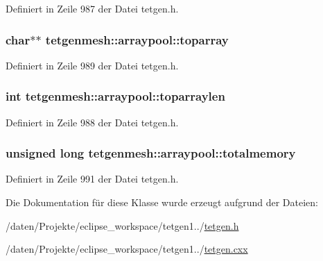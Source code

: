 Definiert in Zeile 987 der Datei tetgen.\-h.

\hypertarget{classtetgenmesh_1_1arraypool_a3a4e28a88226f1dd777773fe45094650}{
\subsubsection[{toparray}]{\setlength{\rightskip}{0pt plus 5cm}char$\ast$$\ast$ tetgenmesh\-::arraypool\-::toparray}}\label{classtetgenmesh_1_1arraypool_a3a4e28a88226f1dd777773fe45094650}


Definiert in Zeile 989 der Datei tetgen.\-h.

\hypertarget{classtetgenmesh_1_1arraypool_aa9ced327d45678f31b4e7f8e75aff861}{
\subsubsection[{toparraylen}]{\setlength{\rightskip}{0pt plus 5cm}int tetgenmesh\-::arraypool\-::toparraylen}}\label{classtetgenmesh_1_1arraypool_aa9ced327d45678f31b4e7f8e75aff861}


Definiert in Zeile 988 der Datei tetgen.\-h.

\hypertarget{classtetgenmesh_1_1arraypool_af264f265d5752e75f50adea472ecd59f}{
\subsubsection[{totalmemory}]{\setlength{\rightskip}{0pt plus 5cm}unsigned long tetgenmesh\-::arraypool\-::totalmemory}}\label{classtetgenmesh_1_1arraypool_af264f265d5752e75f50adea472ecd59f}


Definiert in Zeile 991 der Datei tetgen.\-h.



Die Dokumentation für diese Klasse wurde erzeugt aufgrund der Dateien\-:\begin{DoxyCompactItemize}
\item 
/daten/\-Projekte/eclipse\-\_\-workspace/tetgen1../\hyperlink{tetgen_8h}{tetgen.\-h}\item 
/daten/\-Projekte/eclipse\-\_\-workspace/tetgen1../\hyperlink{tetgen_8cxx}{tetgen.\-cxx}\end{DoxyCompactItemize}
